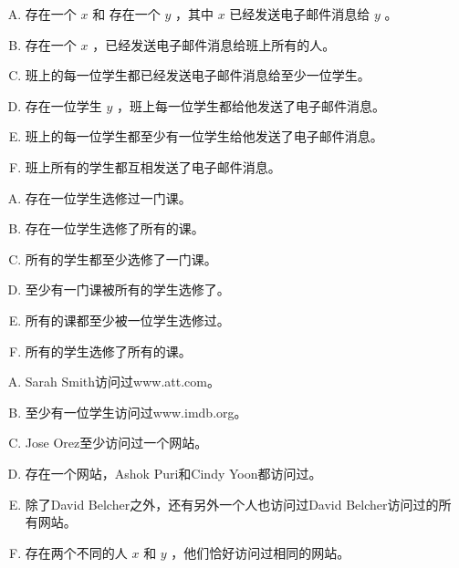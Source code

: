 {{        %
        \begin{practices}
            \begin{enumerate}[A.]
                \item 存在一个 $x$ 和 存在一个 $y$ ，其中 $x$ 已经发送电子邮件消息给 $y$ 。
                \item 存在一个 $x$ ，已经发送电子邮件消息给班上所有的人。
                \item 班上的每一位学生都已经发送电子邮件消息给至少一位学生。
                \item 存在一位学生 $y$ ，班上每一位学生都给他发送了电子邮件消息。
                \item 班上的每一位学生都至少有一位学生给他发送了电子邮件消息。
                \item 班上所有的学生都互相发送了电子邮件消息。
            \end{enumerate}
        \end{practices}

        \begin{practices}
            \begin{enumerate}[A.]
                \item 存在一位学生选修过一门课。
                \item 存在一位学生选修了所有的课。
                \item 所有的学生都至少选修了一门课。
                \item 至少有一门课被所有的学生选修了。
                \item 所有的课都至少被一位学生选修过。
                \item 所有的学生选修了所有的课。
            \end{enumerate}
        \end{practices}

        \begin{practices}
            \begin{enumerate}[A.]
                \item Sarah Smith访问过www.att.com。
                \item 至少有一位学生访问过www.imdb.org。
                \item Jose Orez至少访问过一个网站。
                \item 存在一个网站，Ashok Puri和Cindy Yoon都访问过。
                \item 除了David Belcher之外，还有另外一个人也访问过David Belcher访问过的所有网站。
                \item 存在两个不同的人 $x$ 和 $y$ ，他们恰好访问过相同的网站。
            \end{enumerate}
        \end{practices}

}}
